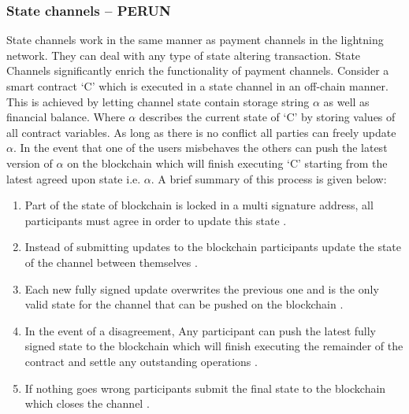 \subsubsection{State channels – PERUN} \label{SCP}
State channels work in the same manner as payment channels in the lightning network. They can deal with any type of state altering transaction. State Channels significantly enrich the functionality of payment channels. Consider a smart contract ‘C’ which is executed in a state channel in an off-chain manner. This is achieved by letting channel state contain storage string $\alpha$ as well as financial balance. Where $\alpha$ describes the current state of ‘C’ by storing values of all contract variables. As long as there is no conflict all parties can freely update $\alpha$. In the event that one of the users misbehaves the others can push the latest version of $\alpha$ on the blockchain which will finish executing ‘C’ starting from the latest agreed upon state i.e. $\alpha$. A brief summary of this process is given below: \cite{misc:012}
\begin{enumerate}

\item Part of the state of blockchain is locked in a multi signature address, all participants must agree in order to update this state \cite{misc:012}.
\item 
Instead of submitting updates to the blockchain participants update the state of the channel between themselves \cite{misc:012}.
\item Each new fully signed update overwrites the previous one and is the only valid state for the channel that can be pushed on the blockchain \cite{misc:012}.
\item In the event of a disagreement, Any participant can push the latest fully signed state to the blockchain which will finish executing the remainder of the contract and settle any outstanding operations \cite{misc:012}.
\item If nothing goes wrong participants submit the final state to the blockchain which closes the channel \cite{ misc:012}.

\end{enumerate}
